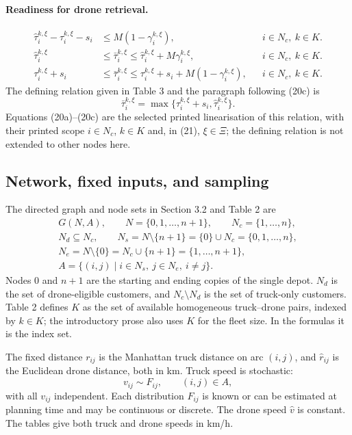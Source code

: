 \documentclass[10pt]{article}
\begin{document}
\paragraph{Readiness for drone retrieval.}
\begin{align}
\hat\tau_i^{k,\xi}-\tau_i^{k,\xi}-s_i&\leq M(1-\gamma_i^{k,\xi}),
&&i\in N_c,\ k\in K.\tag{20a}\\
\hat\tau_i^{k,\xi}&\leq\bar\tau_i^{k,\xi}\leq\hat\tau_i^{k,\xi}+M\gamma_i^{k,\xi},
&&i\in N_c,\ k\in K.\tag{20b}\\
\tau_i^{k,\xi}+s_i&\leq\bar\tau_i^{k,\xi}\leq\tau_i^{k,\xi}+s_i+M(1-\gamma_i^{k,\xi}),
&&i\in N_c,\ k\in K.\tag{20c}
\end{align}
\noindent The defining relation given in Table 3 and the paragraph following (20c) is
\[
\bar\tau_i^{k,\xi}=\max\{\tau_i^{k,\xi}+s_i,\hat\tau_i^{k,\xi}\}.
\]
Equations (20a)--(20c) are the selected printed linearisation of this relation, with their printed scope $i\in N_c$, $k\in K$ and, in (21), $\xi\in\Xi$; the defining relation is not extended to other nodes here.

\subsection*{Network, fixed inputs, and sampling}
The directed graph and node sets in Section 3.2 and Table 2 are
\[
\begin{gathered}
G(N,A),\qquad N=\{0,1,\ldots,n+1\},\qquad N_c=\{1,\ldots,n\},\\
N_d\subseteq N_c,\qquad
N_s=N\setminus\{n+1\}=\{0\}\cup N_c=\{0,1,\ldots,n\},\\
N_e=N\setminus\{0\}=N_c\cup\{n+1\}=\{1,\ldots,n+1\},\\
A=\{(i,j)\mid i\in N_s,\ j\in N_e,\ i\ne j\}.
\end{gathered}
\]
Nodes $0$ and $n+1$ are the starting and ending copies of the single depot. $N_d$ is the set of drone-eligible customers, and $N_c\setminus N_d$ is the set of truck-only customers. Table 2 defines $K$ as the set of available homogeneous truck--drone pairs, indexed by $k\in K$; the introductory prose also uses $K$ for the fleet size. In the formulas it is the index set.

The fixed distance $r_{ij}$ is the Manhattan truck distance on arc $(i,j)$, and $\hat r_{ij}$ is the Euclidean drone distance, both in km. Truck speed is stochastic:
\[
v_{ij}\sim F_{ij},\qquad (i,j)\in A,
\]
with all $v_{ij}$ independent. Each distribution $F_{ij}$ is known or can be estimated at planning time and may be continuous or discrete. The drone speed $\hat v$ is constant. The tables give both truck and drone speeds in km/h.
\end{document}
